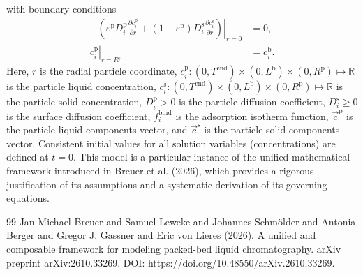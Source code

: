 \documentclass{article}
\begin{document}
with boundary conditions
\begin{align}
    - \left. \left( \varepsilon^{\mathrm{p}} D^{\mathrm{p}}_{i} \frac{\partial c^{\mathrm{p}}_{i}}{\partial r} + (1 - \varepsilon^{\mathrm{p}}) D^{\mathrm{s}}_{i} \frac{\partial c^{\mathrm{s}}_{i}}{\partial r} \right) \right|_{r=0}
    &= 0,
    \\
    \left. c^{\mathrm{p}}_{i} \right|_{r = R^{\mathrm{p}}}
    &= c^{\mathrm{b}}_{i}.
\end{align}
Here, $r$ is the radial particle coordinate, $c^{\mathrm{p}}_{i}\colon (0, T^{\mathrm{end}}) \times (0, L^{\mathrm{b}})\times (0, R^{\mathrm{p}}) \mapsto \mathbb{R}$ is the particle liquid concentration, $c^{\mathrm{s}}_{i}\colon (0, T^{\mathrm{end}}) \times (0, L^{\mathrm{b}})\times (0, R^{\mathrm{p}}) \mapsto \mathbb{R}$ is the particle solid concentration, $D^{\mathrm{p}}_{i}> 0$ is the particle diffusion coefficient, $D^{\mathrm{s}}_{i}\geq 0$ is the surface diffusion coefficient, $f^{\mathrm{bind}}_{i}$ is the adsorption isotherm function, $\vec{c}^{\mathrm{p}}$ is the particle liquid components vector, and $\vec{c}^{\mathrm{s}}$ is the particle solid components vector.
Consistent initial values for all solution variables (concentrations) are defined at $t = 0$.
This model is a particular instance of the unified mathematical framework introduced in Breuer et al. (2026), which provides a rigorous justification of its assumptions and a systematic derivation of its governing equations.
\begin{thebibliography}{99}
     Jan Michael Breuer and Samuel Leweke and Johannes Schmölder and Antonia Berger and Gregor J. Gassner and Eric von Lieres (2026). A unified and composable framework for modeling packed-bed liquid chromatography. arXiv preprint arXiv:2610.33269. DOI: https://doi.org/10.48550/arXiv.2610.33269.
\end{thebibliography}
\end{document}
